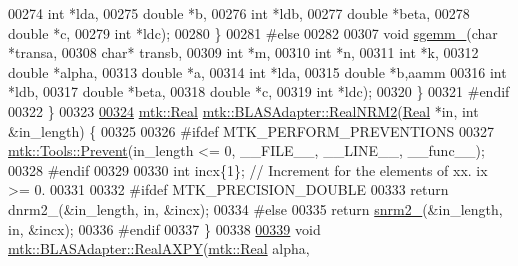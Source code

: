 \begin{DoxyCode}
00274             \textcolor{keywordtype}{int} *lda,
00275             \textcolor{keywordtype}{double} *b,
00276             \textcolor{keywordtype}{int} *ldb,
00277             \textcolor{keywordtype}{double} *beta,
00278             \textcolor{keywordtype}{double} *c,
00279             \textcolor{keywordtype}{int} *ldc);
00280 \}
00281 \textcolor{preprocessor}{#else}
00282 
00307 \textcolor{keywordtype}{void} \hyperlink{namespacemtk_adb7c0560326b8e57f255e58b87ec76b0}{sgemm\_}(\textcolor{keywordtype}{char} *transa,
00308             \textcolor{keywordtype}{char}* transb,
00309             \textcolor{keywordtype}{int} *m,
00310             \textcolor{keywordtype}{int} *n,
00311             \textcolor{keywordtype}{int} *k,
00312             \textcolor{keywordtype}{double} *alpha,
00313             \textcolor{keywordtype}{double} *a,
00314             \textcolor{keywordtype}{int} *lda,
00315             \textcolor{keywordtype}{double} *b,aamm
00316             \textcolor{keywordtype}{int} *ldb,
00317             \textcolor{keywordtype}{double} *beta,
00318             \textcolor{keywordtype}{double} *c,
00319             \textcolor{keywordtype}{int} *ldc);
00320 \}
00321 \textcolor{preprocessor}{#endif}
00322 \}
00323 
\hypertarget{mtk__blas__adapter_8cc_source_l00324}{}\hyperlink{classmtk_1_1BLASAdapter_ab92440888b730863244c5d9479c11aca}{00324} \hyperlink{group__c01-roots_gac080bbbf5cbb5502c9f00405f894857d}{mtk::Real} \hyperlink{classmtk_1_1BLASAdapter_ab92440888b730863244c5d9479c11aca}{mtk::BLASAdapter::RealNRM2}(\hyperlink{group__c01-roots_gac080bbbf5cbb5502c9f00405f894857d}{Real} *in, \textcolor{keywordtype}{int} &in\_length) \{
00325 
00326 \textcolor{preprocessor}{  #ifdef MTK\_PERFORM\_PREVENTIONS}
00327   \hyperlink{classmtk_1_1Tools_a332324c6f25e66be9dff48c5987a3b9f}{mtk::Tools::Prevent}(in\_length <= 0, \_\_FILE\_\_, \_\_LINE\_\_, \_\_func\_\_);
00328 \textcolor{preprocessor}{  #endif}
00329 
00330   \textcolor{keywordtype}{int} incx\{1\};  \textcolor{comment}{// Increment for the elements of xx. ix >= 0.}
00331 
00332 \textcolor{preprocessor}{  #ifdef MTK\_PRECISION\_DOUBLE}
00333   \textcolor{keywordflow}{return} dnrm2\_(&in\_length, in, &incx);
00334 \textcolor{preprocessor}{  #else}
00335   \textcolor{keywordflow}{return} \hyperlink{namespacemtk_a508e99fcb14d526bc43aa0a80aa4b658}{snrm2\_}(&in\_length, in, &incx);
00336 \textcolor{preprocessor}{  #endif}
00337 \}
00338 
\hypertarget{mtk__blas__adapter_8cc_source_l00339}{}\hyperlink{classmtk_1_1BLASAdapter_a081cd092ae65e730f44eae8643edd539}{00339} \textcolor{keywordtype}{void} \hyperlink{classmtk_1_1BLASAdapter_a081cd092ae65e730f44eae8643edd539}{mtk::BLASAdapter::RealAXPY}(\hyperlink{group__c01-roots_gac080bbbf5cbb5502c9f00405f894857d}{mtk::Real} alpha,

\end{DoxyCode}
